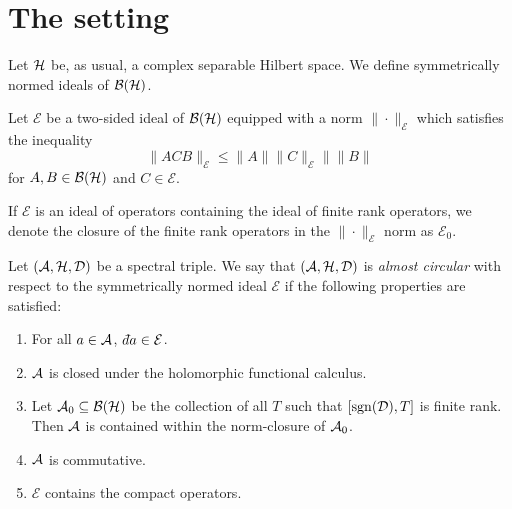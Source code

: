 \section{The setting}
Let $\mathcal{H}$ be, as usual, a complex separable Hilbert space. We
define symmetrically normed ideals of $\mathcal{B}(\mathcal{H})$.
\begin{definition}
    Let $\mathcal{E}$ be a two-sided ideal of $\mathcal{B}(\mathcal{H})$
    equipped with a norm $\|\cdot\|_{\mathcal{E}}$ which satisfies the inequality
    \begin{equation}
        \|ACB\|_{\mathcal{E}} \leq \|A\|\|C\|_\mathcal{E}\|\|B\|
    \end{equation}
    for $A,B \in \mathcal{B}(\mathcal{H})$ and $C \in \mathcal{E}$.
\end{definition}

\begin{definition}
    If $\mathcal{E}$ is an ideal of operators containing the ideal of finite rank
    operators, we denote the closure of the finite rank operators in the $\|\cdot\|_\mathcal{E}$
    norm as $\mathcal{E}_0$.
\end{definition}

\begin{definition}
    Let $(\mathcal{A},\mathcal{H},\mathcal{D})$ be a spectral triple. We say that $(\mathcal{A},\mathcal{H},\mathcal{D})$
    is \emph{almost circular} with respect
    to the symmetrically normed ideal $\mathcal{E}$
     if the following properties are satisfied:
    \begin{enumerate}
        \item{} For all $a \in \mathcal{A}$, $\qd a \in \mathcal{E}$.
        \item{} $\mathcal{A}$ is closed under the holomorphic functional calculus.
        \item{} Let $\mathcal{A}_0 \subseteq \mathcal{B}(\mathcal{H})$ be the collection of all
        $T$ such that $[\operatorname{sgn}(\mathcal{D}),T]$ is finite rank. Then $\mathcal{A}$ is contained
        within the norm-closure of $\mathcal{A}_0$.
        \item{} $\mathcal{A}$ is commutative.
        \item{} $\mathcal{E}$ contains the compact operators.
    \end{enumerate}
\end{definition}


